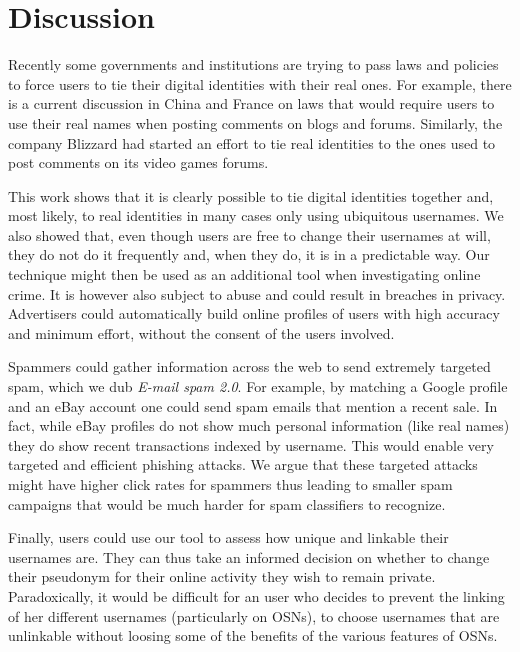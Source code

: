 \documentclass[letterpaper]{sig-alternate}
\begin{document}
\section{Discussion}
\label{sec:discussion}

Recently some governments and institutions are trying to pass laws and policies
to force users to tie their digital identities with their real ones. For
example, there is a current discussion in China and France \cite{france} 
on laws that would require users to use their real names when posting
comments on blogs and forums.  Similarly, the company Blizzard had started
an effort to tie real identities to the ones used to post comments on its
video games forums.

This work shows that it is clearly possible to tie digital identities together
and, most likely, to real identities in many cases only using ubiquitous
usernames. We also showed that, even though users are free to change their
usernames at will, they do not do it frequently and, when they do, it is in a
predictable way. Our technique might then be used as an additional tool when
investigating online crime. It is however also subject to abuse and could
result in breaches in privacy.  Advertisers could automatically build online
profiles of users with high accuracy and minimum effort, without the consent of
the users involved.

Spammers could gather information across the web to send
extremely targeted spam, which we dub {\em E-mail spam 2.0}.  For example, by
matching a Google profile and an eBay account one could send spam emails that
mention a recent sale. In fact, while eBay profiles do not show much personal
information (like real names) they do show recent transactions indexed by username.
This would enable very targeted and efficient phishing attacks. We argue
that these targeted attacks might have higher click rates for spammers thus
leading to smaller spam campaigns that would be much harder for spam
classifiers to recognize.

Finally, users could use our tool to assess how unique and linkable their
usernames are. They can thus take an informed decision on whether to change
their pseudonym for their online activity they wish to remain private.
Paradoxically, it would be difficult for an user who decides to prevent the
linking of her different usernames (particularly on OSNs), to choose usernames
that are unlinkable without loosing some of the
benefits of the various features of OSNs. 
\end{document}
